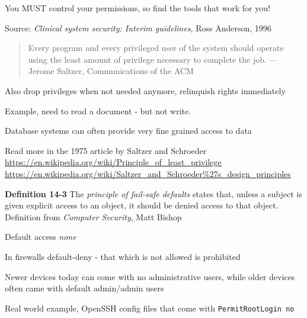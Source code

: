 \documentclass[Screen16to9,17pt]{foils}
\begin{document}
You MUST control your permissions, so find the tools that work for you!






Source:
\emph{Clinical system security: Interim guidelines}, Ross Anderson, 1996




\begin{quote}
Every program and every privileged user of the system should operate using the least amount of privilege necessary to complete the job. — Jerome Saltzer, Communications of the ACM
\end{quote}

\begin{list1}
\item Also drop privileges when not needed anymore, relinquish rights immediately
\item Example, need to read a document - but not write.
\item Database systems can often provide very fine grained access to data
\end{list1}

Read more in the 1975 article by Saltzer and Schroeder\\
\url{https://en.wikipedia.org/wiki/Principle_of_least_privilege}\\
\url{https://en.wikipedia.org/wiki/Saltzer_and_Schroeder%27s_design_principles}


\begin{list1}
\item {\bf Definition 14-3} The \emph{principle of fail-safe defaults} states that, unless a subject is given explicit access to an object, it should be denied access to that object.\\
Definition from \emph{Computer Security}, Matt Bishop
\item Default access \emph{none}
\item In firewalls default-deny - that which is not allowed is prohibited
\item Newer devices today can come with no administrative users, while older devices often came with default admin/admin users
\item Real world example, OpenSSH config files that come with \verb+PermitRootLogin no+
\end{list1}
\end{document}
